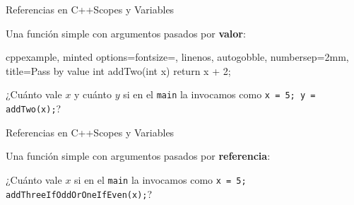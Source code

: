 \documentclass[spanish, c]{beamer}
\begin{document}
\begin{frame}[fragile]{Referencias en C++}{Scopes y Variables}
    
    Una función simple con argumentos pasados por \textbf{valor}:

    \bigskip

    \begin{tcblisting}{cppexample, minted options={fontsize=\footnotesize, linenos, autogobble, numbersep=2mm}, title={Pass by value}}
        int addTwo(int x){
            return x + 2;
        }
    \end{tcblisting}

    \begin{center}
        ¿Cuánto vale $x$ y cuánto $y$ si en el \texttt{main} la invocamos como \texttt{x = 5; y = addTwo(x);}?
    \end{center}
\end{frame}

\begin{frame}[fragile]{Referencias en C++}{Scopes y Variables}
    
    Una función simple con argumentos pasados por \textbf{referencia}:

    \bigskip


    \begin{center}
        ¿Cuánto vale $x$ si en el \texttt{main} la invocamos como \texttt{x = 5; addThreeIfOddOrOneIfEven(x);}?
    \end{center}
\end{frame}




\end{document}
